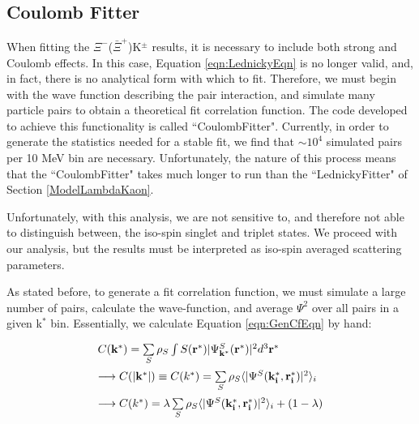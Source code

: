 \documentclass[ALICE,manyauthors]{cernphprep}
\begin{document}
\subsection{Coulomb Fitter}
\label{CoulombFitter}

When fitting the $\Xi^{-}$($\bar{\Xi}^{+}$)K$^{\pm}$ results, it is necessary to include both strong and Coulomb effects.
In this case, Equation \ref{eqn:LednickyEqn} is no longer valid, and, in fact, there is no analytical form with which to fit.
Therefore, we must begin with the wave function describing the pair interaction, and simulate many particle pairs to obtain a theoretical fit correlation function.
The code developed to achieve this functionality is called ``CoulombFitter".
Currently, in order to generate the statistics needed for a stable fit, we find that $\sim 10^{4}$ simulated pairs per 10 MeV bin are necessary.
Unfortunately, the nature of this process means that the ``CoulombFitter" takes much longer to run than the ``LednickyFitter" of Section \ref{ModelLambdaKaon}.


Unfortunately, with this analysis, we are not sensitive to, and therefore not able to distinguish between, the iso-spin singlet and triplet states.  We proceed with our analysis, but the results must be interpreted as iso-spin averaged scattering parameters.


As stated before, to generate a fit correlation function, we must simulate a large number of pairs, calculate the wave-function, and average $\Psi^{2}$ over all pairs in a given k$^{*}$ bin.  Essentially, we calculate Equation \ref{eqn:GenCfEqn} by hand:

\begin{equation}
\begin{array}{l}
\vspace{2mm}
  C(\mathbf{k^{*}}) = \sum\limits_{S}\rho_{S}\int S(\mathbf{r^{*}})|\Psi^{S}_{\mathbf{k^{*}}}(\mathbf{r^{*}})|^{2}d^{3}\mathbf{r^{*}} \\
\vspace{2mm}
  \longrightarrow C(|\mathbf{k^{*}}|) \equiv C(k^{*}) = \sum\limits_{S}\rho_{S}\langle |\Psi^{S}(\mathbf{k^{*}_{i}},\mathbf{r^{*}_{i}})|^{2} \rangle_{i} \\
\vspace{2mm}
  \longrightarrow C(k^{*}) = \lambda\sum\limits_{S}\rho_{S}\langle |\Psi^{S}(\mathbf{k^{*}_{i}},\mathbf{r^{*}_{i}})|^{2} \rangle_{i} + (1-\lambda)

\end{array}
\label{eqn:CoulombEqn2}
\end{equation}
\end{document}
